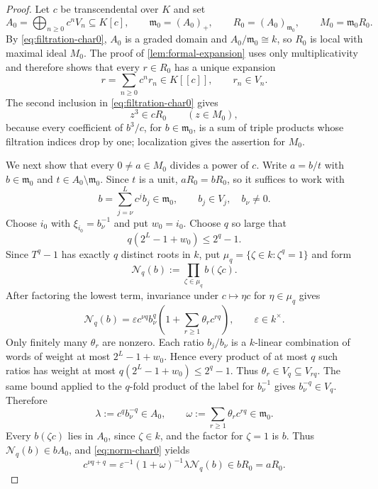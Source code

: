 \documentclass[11pt,reqno]{amsart}
\numberwithin{equation}{section}
\theoremstyle{plain}
\theoremstyle{definition}
\theoremstyle{remark}
\newcommand{\fm}{\mathfrak m}
\begin{document}
\begin{proof}
Let $c$ be transcendental over $K$ and set
\[
 A_0=\bigoplus_{n\geq0}c^nV_n\subseteq K[c],\qquad
 \fm_0=(A_0)_+,
 \qquad R_0=(A_0)_{\fm_0},\qquad M_0=\fm_0R_0.
\]
By \eqref{eq:filtration-char0}, $A_0$ is a graded domain and
$A_0/\fm_0\cong k$, so $R_0$ is local with maximal ideal $M_0$.  The proof
of \cref{lem:formal-expansion} uses only multiplicativity and therefore
shows that every $r\in R_0$ has a unique expansion
\begin{equation}\label{eq:formal-char0}
  r=\sum_{n\geq0}c^nr_n\in K[[c]],\qquad r_n\in V_n.
\end{equation}
The second inclusion in \eqref{eq:filtration-char0} gives
\begin{equation}\label{eq:cube-char0}
  z^3\in cR_0\qquad(z\in M_0),
\end{equation}
because every coefficient of $b^3/c$, for $b\in\fm_0$, is a sum of
triple products whose filtration indices drop by one; localization gives
the assertion for $M_0$.

We next show that every $0\neq a\in M_0$ divides a power of $c$.  Write
$a=b/t$ with $b\in\fm_0$ and $t\in A_0\setminus\fm_0$.  Since $t$ is a
unit, $aR_0=bR_0$, so it suffices to work with
\[
  b=\sum_{j=\nu}^{L}c^jb_j\in\fm_0,
  \qquad b_j\in V_j,\quad b_\nu\neq0.
\]
Choose $i_0$ with $\xi_{i_0}=b_\nu^{-1}$ and put $w_0=i_0$.
Choose $q$ so large that
\[
  q(2^L-1+w_0)\leq2^q-1.
\]
Since $T^q-1$ has exactly $q$ distinct roots in $k$, put
$\mu_q=\{\zeta\in k:\zeta^q=1\}$ and form
\[
  \mathcal N_q(b):=\prod_{\zeta\in\mu_q}b(\zeta c).
\]
After factoring the lowest term, invariance under $c\mapsto\eta c$ for
$\eta\in\mu_q$ gives
\begin{equation}\label{eq:norm-char0}
 \mathcal N_q(b)=\varepsilon c^{\nu q}b_\nu^q
  \left(1+\sum_{r\geq1}\theta_r c^{rq}\right),
  \qquad \varepsilon\in k^\times.
\end{equation}
Only finitely many $\theta_r$ are nonzero.
Each ratio $b_j/b_\nu$ is a $k$-linear combination of words of weight at
most $2^L-1+w_0$.  Hence every product of at most $q$ such ratios has weight
at most $q(2^L-1+w_0)\leq2^q-1$.  Thus
$\theta_r\in V_q\subseteq V_{rq}$.  The same bound applied to the $q$-fold
product of the label for $b_\nu^{-1}$ gives $b_\nu^{-q}\in V_q$.
Therefore
\[
 \lambda:=c^qb_\nu^{-q}\in A_0,
 \qquad \omega:=\sum_{r\geq1}\theta_rc^{rq}\in\fm_0.
\]
Every $b(\zeta c)$ lies in $A_0$, since $\zeta\in k$, and the factor for
$\zeta=1$ is $b$.  Thus $\mathcal N_q(b)\in bA_0$, and
\eqref{eq:norm-char0} yields
\[
 c^{\nu q+q}=\varepsilon^{-1}(1+\omega)^{-1}
   \lambda\mathcal N_q(b)\in bR_0=aR_0.
\]


\end{proof}
\end{document}

